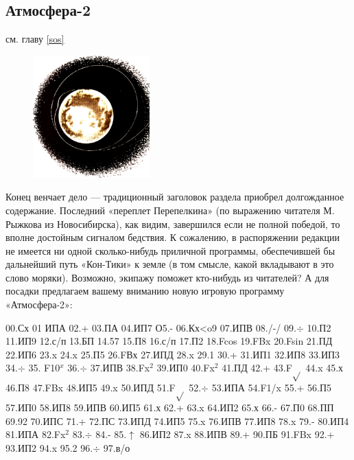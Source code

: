 \documentclass[11pt,a4paper,oneside]{article}
\begin{document}
\subsection{Атмосфера-2}

см. главу \ref{sos}

\begin{figure}
\includegraphics[width=0.4\textwidth]{sos3}
\end{figure}
Конец венчает дело — традиционный заголовок раздела приобрел долгожданное содержание. Последний «переплет Перепелкина» (по выражению читателя М. Рыжкова из Новосибирска), как видим, завершился если не полной победой, то вполне достойным сигналом бедствия. К сожалению, в распоряжении редакции не имеется ни одной сколько-нибудь приличной программы, обеспечившей бы дальнейший путь «Кон-Тики» к земле (в том смысле, какой вкладывают в это слово моряки). Возможно, экипажу поможет кто-нибудь из читателей? А для посадки предлагаем вашему вниманию новую игровую программу «Атмосфера-2»:

00.Сх 01 ИПА 02.+ 03.ПА 04.ИП7 О5.- 06.Кх<o9
07.ИПВ 08./-/ 09.$\div$ 10.П2 11.ИП9 12.с/п 13.БП
14.57 15.П8 16.с/п 17.П2 18.Fcos 19.FBx
20.Fsin 21.ПД 22.ИП6 23.x 24.x 25.П5
26.FВх 27.ИПД 28.x 29.1 30.+ 31.ИП1 32.ИП8
33.ИП3 34.$\div$ 35. F10$^{x}$ 36.$\div$ 37.ИПВ 38.Fx$^{2}$
39.ИП0 40.Fx$^{2}$ 41.ПД 42.+ 43.F$\sqrt{}$ 44.x 45.х
46.П8 47.FBx 48.ИП5 49.x 50.ИПД 51.F$\sqrt{}$
52.$\div$ 53.ИПА 54.F1/x 55.+ 56.П5 57.ИП0
58.ИП8 59.ИПВ 60.ИП5 61.х 62.+ 63.x
64.ИП2 65.х 66.- 67.П0 68.ПП 69.92
70.ИПС 71.+ 72.ПС 73.ИПД 74.ИП5 75.x
76.ИПВ 77.ИП8 78.x 79.- 80.ИП4 81.ИПА
82.Fx$^{2}$ 83.$\div$ 84.- 85.$\uparrow$ 86.ИП2 87.x 88.ИПВ
89.+ 90.ПБ 91.FBx 92.+ 93.ИП2 94.x
95.2 96.$\div$ 97.в/о
\end{document}
